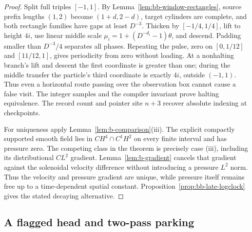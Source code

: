 \begin{proof}
Split full triples $[-1,1]$.  By
Lemma~\ref{lem:bb-window-rectangles}, source prefix lengths $(1,2)$
become $(1+d,2-d)$, target cylinders are complete, and both rectangle
families have gaps at least $D^{-3}$.  Thicken by $[-1/4,1/4]$,
lift to height $4i$, use linear middle scale
$\mu_i=1+(D^{-d_i}-1)\theta$, and descend.  Padding smaller than
$D^{-3}/4$ separates all phases.  Repeating the pulse, zero on
$[0,1/12]$ and $[11/12,1]$, gives periodicity from zero without
loading.  At a nonhalting branch's lift and descent the first
coordinate is greater than one; during the middle transfer the
particle's third coordinate is exactly $4i$, outside $(-1,1)$.
Thus even a horizontal route passing over the observation box cannot
cause a false visit.  The integer samples and the compiler invariant
prove halting equivalence.  The record count and pointer site $n+3$
recover absolute indexing at checkpoints.

For uniqueness apply Lemma~\ref{lem:b-comparison}(iii).
The explicit compactly supported smooth field lies in $CH^4\cap C^1H^2$
on every finite interval and has pressure zero.  The competing class
in the theorem is precisely case (iii), including its distributional
$CL^2$ gradient.  Lemma~\ref{lem:b-gradient} cancels that gradient
against the solenoidal velocity difference without introducing a pressure
$L^2$ norm.  Thus the velocity and pressure gradient are unique, while
pressure itself remains free up to a time-dependent spatial constant.
Proposition~\ref{prop:bb-late-logclock} gives the stated
decaying alternative.
\end{proof}

\subsection{A flagged head and two-pass parking}
\label{sec:bb-two-pass-parking}

